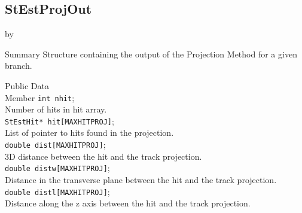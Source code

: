 \documentclass[twoside]{article}
\newcommand{\entrylabel}[1]{\mbox{\textbf{{#1}}}\hfil}%
\newenvironment{entry}
{\begin{list}{}%
    {\renewcommand{\makelabel}{\entrylabel}%
     \setlength{\labelwidth}{90pt}%
     \setlength{\leftmargin}{\labelwidth}
     \advance\leftmargin by \labelsep%
      }%
    }%
  {\end{list}}
\newcommand{\Entrylabel}[1]%
{\raisebox{0pt}[1ex][0pt]{\makebox[\labelwidth][l]%
    {\parbox[t]{\labelwidth}{\hspace{0pt}\textbf{{#1}}}}}}
\newenvironment{Entry}%
{\renewcommand{\entrylabel}{\Entrylabel}\begin{entry}}%
  {\end{entry}}
\begin{document}
\subsection{StEstProjOut}
\label{sec:StestProjOutq}
\begin{Entry}
\item[Summary]
Structure containing the output of the Projection Method for a given branch.
\item[Public Data\\ Member]
\verb+int nhit+; \\
Number of hits in hit array.\\
\verb+StEstHit* hit[MAXHITPROJ]+; \\
List of pointer to hits found in the projection.\\
\verb+double dist[MAXHITPROJ]+;\\
3D distance between the hit and the track projection.\\
\verb+double distw[MAXHITPROJ]+;\\
Distance in the transverse plane between the hit and the track projection.\\
\verb+double distl[MAXHITPROJ]+;\\
Distance along the z axis between the hit and the track projection.\\
\end{Entry}
%
%
\end{document}
